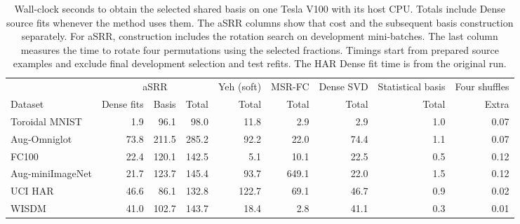 \begin{table}[htbp]
\centering\small
\caption{Wall-clock seconds to obtain the selected shared basis on one
Tesla V100 with its host CPU. Totals include Dense source fits whenever
the method uses them. The aSRR columns show that cost and the subsequent
basis construction separately. For aSRR, construction includes the
rotation search on development mini-batches. The last column measures
the time to rotate four permutations using the selected fractions.
Timings start from prepared source examples and exclude final
development selection and test refits. The HAR Dense fit time is from
the original run.}
\label{tab:transfer-basis-times}
\setlength{\tabcolsep}{3pt}
\begin{tabular*}{\linewidth}{@{\extracolsep{\fill}}lrrrrrrrr@{}}
\toprule
& \multicolumn{3}{c}{aSRR} & Yeh (soft) & MSR-FC & Dense SVD & Statistical basis & Four shuffles \\
\cmidrule(lr){2-4}
Dataset & Dense fits & Basis & Total & Total & Total & Total & Total & Extra \\
\midrule
Toroidal MNIST & 1.9 & 96.1 & 98.0 & 11.8 & 2.9 & 2.9 & 1.0 & 0.07 \\
Aug-Omniglot & 73.8 & 211.5 & 285.2 & 92.2 & 22.0 & 74.4 & 1.1 & 0.07 \\
FC100 & 22.4 & 120.1 & 142.5 & 5.1 & 10.1 & 22.5 & 0.5 & 0.12 \\
Aug-miniImageNet & 21.7 & 123.7 & 145.4 & 93.7 & 649.1 & 22.0 & 1.5 & 0.12 \\
UCI HAR & 46.6 & 86.1 & 132.8 & 122.7 & 69.1 & 46.7 & 0.9 & 0.02 \\
WISDM & 41.0 & 102.7 & 143.7 & 18.4 & 2.8 & 41.1 & 0.3 & 0.01 \\
\bottomrule
\end{tabular*}
\end{table}
